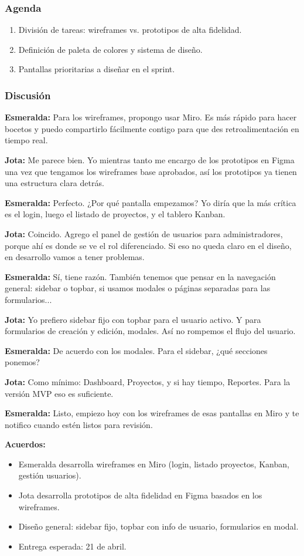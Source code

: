 \documentclass[12pt, a4paper]{article}
\newcommand{\jota}[1]{\noindent\textbf{\color{primary}Jota:} #1\par\smallskip}
\newcommand{\esme}[1]{\noindent\textbf{\color{accentgreen}Esmeralda:} #1\par\smallskip}
\begin{document}
\subsubsection*{Agenda}
\begin{enumerate}[leftmargin=1.5em]
  \item División de tareas: wireframes vs. prototipos de alta fidelidad.
  \item Definición de paleta de colores y sistema de diseño.
  \item Pantallas prioritarias a diseñar en el sprint.
\end{enumerate}

\subsubsection*{Discusión}

\esme{Para los wireframes, propongo usar Miro. Es más rápido para hacer bocetos y puedo compartirlo fácilmente contigo para que des retroalimentación en tiempo real.}

\jota{Me parece bien. Yo mientras tanto me encargo de los prototipos en Figma una vez que tengamos los wireframes base aprobados, así los prototipos ya tienen una estructura clara detrás.}

\esme{Perfecto. ¿Por qué pantalla empezamos? Yo diría que la más crítica es el login, luego el listado de proyectos, y el tablero Kanban.}

\jota{Coincido. Agrego el panel de gestión de usuarios para administradores, porque ahí es donde se ve el rol diferenciado. Si eso no queda claro en el diseño, en desarrollo vamos a tener problemas.}

\esme{Sí, tiene razón. También tenemos que pensar en la navegación general: sidebar o topbar, si usamos modales o páginas separadas para las formularios...}

\jota{Yo prefiero sidebar fijo con topbar para el usuario activo. Y para formularios de creación y edición, modales. Así no rompemos el flujo del usuario.}

\esme{De acuerdo con los modales. Para el sidebar, ¿qué secciones ponemos?}

\jota{Como mínimo: Dashboard, Proyectos, y si hay tiempo, Reportes. Para la versión MVP eso es suficiente.}

\esme{Listo, empiezo hoy con los wireframes de esas pantallas en Miro y te notifico cuando estén listos para revisión.}

\begin{acuerdobox}
\textbf{Acuerdos:}
\begin{itemize}[leftmargin=1.2em, topsep=2pt]
  \item Esmeralda desarrolla wireframes en Miro (login, listado proyectos, Kanban, gestión usuarios).
  \item Jota desarrolla prototipos de alta fidelidad en Figma basados en los wireframes.
  \item Diseño general: sidebar fijo, topbar con info de usuario, formularios en modal.
  \item Entrega esperada: 21 de abril.
\end{itemize}
\end{acuerdobox}
\end{document}
